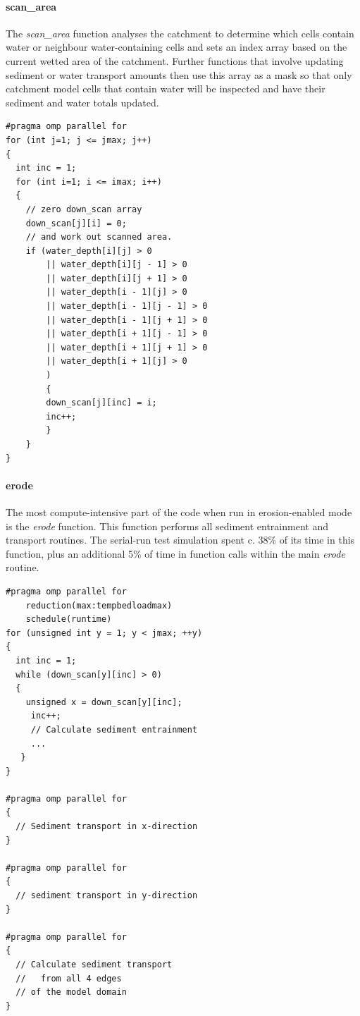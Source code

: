 \paragraph*{scan\_area}
The \textit{scan\_area} function analyses the catchment to determine which cells contain water or neighbour water-containing cells and sets an index array based on the current wetted area of the catchment. Further functions that involve updating sediment or water transport amounts then use this array as a mask so that only catchment model cells that contain water will be inspected and have their sediment and water totals updated.
\begin{verbatim}
#pragma omp parallel for
for (int j=1; j <= jmax; j++)
{
  int inc = 1;
  for (int i=1; i <= imax; i++)
  {
    // zero down_scan array
    down_scan[j][i] = 0;
    // and work out scanned area. 
    if (water_depth[i][j] > 0
        || water_depth[i][j - 1] > 0
        || water_depth[i][j + 1] > 0
        || water_depth[i - 1][j] > 0
        || water_depth[i - 1][j - 1] > 0
        || water_depth[i - 1][j + 1] > 0
        || water_depth[i + 1][j - 1] > 0
        || water_depth[i + 1][j + 1] > 0
        || water_depth[i + 1][j] > 0
        )
        {
        down_scan[j][inc] = i;
        inc++;
        }
    }
}
\end{verbatim}

\paragraph*{erode}
The most compute-intensive part of the code when run in erosion-enabled mode is the \textit{erode} function. This function performs all sediment entrainment and transport routines. The serial-run test simulation spent c. 38\% of its time in this function, plus an additional 5\% of time in function calls within the main \textit{erode} routine. 

\begin{verbatim}
#pragma omp parallel for 
    reduction(max:tempbedloadmax) 
    schedule(runtime) 
for (unsigned int y = 1; y < jmax; ++y) 
{
  int inc = 1;
  while (down_scan[y][inc] > 0)
  {
    unsigned x = down_scan[y][inc];
     inc++;
     // Calculate sediment entrainment
     ...
   }
}

#pragma omp parallel for
{
  // Sediment transport in x-direction
}

#pragma omp parallel for
{
  // sediment transport in y-direction
}

#pragma omp parallel for
{
  // Calculate sediment transport
  //   from all 4 edges
  // of the model domain
}

\end{verbatim}

